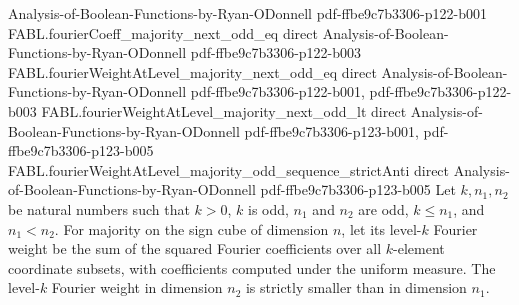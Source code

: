 \begin{theorem}
  {Analysis-of-Boolean-Functions-by-Ryan-ODonnell}
  {pdf-ffbe9c7b3306-p122-b001}
\proofstep
  {FABL.fourierCoeff_majority_next_odd_eq}
  {direct}
  {Analysis-of-Boolean-Functions-by-Ryan-ODonnell}
  {pdf-ffbe9c7b3306-p122-b003}
\proofstep
  {FABL.fourierWeightAtLevel_majority_next_odd_eq}
  {direct}
  {Analysis-of-Boolean-Functions-by-Ryan-ODonnell}
  {pdf-ffbe9c7b3306-p122-b001,
    pdf-ffbe9c7b3306-p122-b003}
\proofstep
  {FABL.fourierWeightAtLevel_majority_next_odd_lt}
  {direct}
  {Analysis-of-Boolean-Functions-by-Ryan-ODonnell}
  {pdf-ffbe9c7b3306-p123-b001,
    pdf-ffbe9c7b3306-p123-b005}
\proofstep
  {FABL.fourierWeightAtLevel_majority_odd_sequence_strictAnti}
  {direct}
  {Analysis-of-Boolean-Functions-by-Ryan-ODonnell}
  {pdf-ffbe9c7b3306-p123-b005}
Let $k,n_1,n_2$ be natural numbers such that $k>0$, $k$ is odd, $n_1$ and $n_2$ are odd,
$k\le n_1$, and $n_1<n_2$. For majority on the sign cube of dimension $n$, let its
level-$k$ Fourier weight be the sum of the squared Fourier coefficients over all
$k$-element coordinate subsets, with coefficients computed under the uniform measure.
The level-$k$ Fourier weight in dimension $n_2$ is strictly smaller than in dimension
$n_1$.
\end{theorem}
